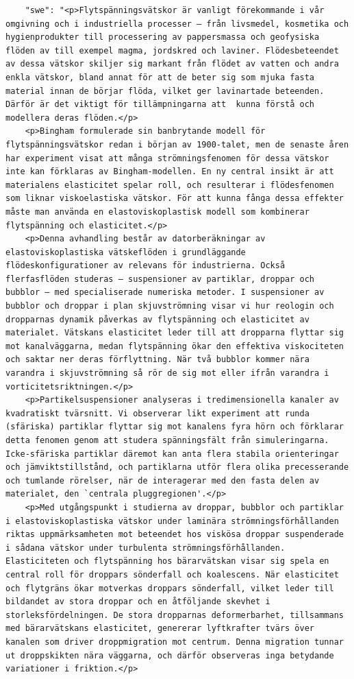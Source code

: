 \begin{casestudySection}
\begin{lstlisting}
    "swe": "<p>Flytspänningsvätskor är vanligt förekommande i vår omgivning och i industriella processer – från livsmedel, kosmetika och hygienprodukter till processering av pappersmassa och geofysiska flöden av till exempel magma, jordskred och laviner. Flödesbeteendet av dessa vätskor skiljer sig markant från flödet av vatten och andra enkla vätskor, bland annat för att de beter sig som mjuka fasta material innan de börjar flöda, vilket ger lavinartade beteenden. Därför är det viktigt för tillämpningarna att  kunna förstå och modellera deras flöden.</p>
    <p>Bingham formulerade sin banbrytande modell för flytspänningsvätskor redan i början av 1900-talet, men de senaste åren har experiment visat att många strömningsfenomen för dessa vätskor inte kan förklaras av Bingham-modellen. En ny central insikt är att materialens elasticitet spelar roll, och resulterar i flödesfenomen som liknar viskoelastiska vätskor. För att kunna fånga dessa effekter måste man använda en elastoviskoplastisk modell som kombinerar flytspänning och elasticitet.</p>
    <p>Denna avhandling består av datorberäkningar av elastoviskoplastiska vätskeflöden i grundläggande flödeskonfigurationer av relevans för industrierna. Också flerfasflöden studeras – suspensioner av partiklar, droppar och bubblor – med specialiserade numeriska metoder. I suspensioner av bubblor och droppar i plan skjuvströmning visar vi hur reologin och dropparnas dynamik påverkas av flytspänning och elasticitet av materialet. Vätskans elasticitet leder till att dropparna flyttar sig mot kanalväggarna, medan flytspänning ökar den effektiva viskociteten och saktar ner deras förflyttning. När två bubblor kommer nära varandra i skjuvströmning så rör de sig mot eller ifrån varandra i vorticitetsriktningen.</p>
    <p>Partikelsuspensioner analyseras i tredimensionella kanaler av kvadratiskt tvärsnitt. Vi observerar likt experiment att runda (sfäriska) partiklar flyttar sig mot kanalens fyra hörn och förklarar detta fenomen genom att studera spänningsfält från simuleringarna. Icke-sfäriska partiklar däremot kan anta flera stabila orienteringar och jämviktstillstånd, och partiklarna utför flera olika precesserande och tumlande rörelser, när de interagerar med den fasta delen av materialet, den `centrala pluggregionen'.</p>
    <p>Med utgångspunkt i studierna av droppar, bubblor och partiklar i elastoviskoplastiska vätskor under laminära strömningsförhållanden riktas uppmärksamheten mot beteendet hos viskösa droppar suspenderade i sådana vätskor under turbulenta strömningsförhållanden. Elasticiteten och flytspänning hos bärarvätskan visar sig spela en central roll för droppars sönderfall och koalescens. När elasticitet och flytgräns ökar motverkas droppars sönderfall, vilket leder till bildandet av stora droppar och en åtföljande skevhet i storleksfördelningen. De stora dropparnas deformerbarhet, tillsammans med bärarvätskans elasticitet, genererar lyftkrafter tvärs över kanalen som driver droppmigration mot centrum. Denna migration tunnar ut droppskikten nära väggarna, och därför observeras inga betydande variationer i friktion.</p>

\end{lstlisting}
\end{casestudySection}

